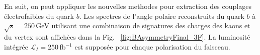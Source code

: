 En suit, on peut appliquer les nouvelles methodes pour extraction des couplages \'electrofaibles du quark $b$. 
Les spectres de l'angle polaire reconstruits du quark $b$ à $\sqrt{s} = 250$\,GeV utilisant une combinaison de signatures des charges des kaons et du vertex sont affich\`ees dans la Fig. ~\ref{fig:BAsymmetryFinal_3F}. La luminosité intégrée $\mathcal{L}_I=250$\,fb$^{-1}$ est supposée pour chaque polarisation du faisceau.


